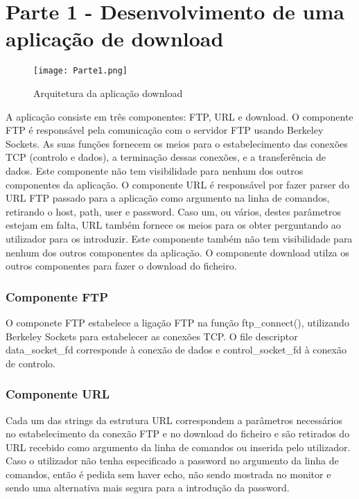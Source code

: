 \documentclass[a4paper]{article}
\begin{document}
\section{Parte 1 - Desenvolvimento de uma aplicação de download}

\begin{figure}[h]
    \centering
    \texttt{[image: Parte1.png]}
    \caption{Arquitetura da aplicação download}
\end{figure}


A aplicação consiste em três componentes: FTP, URL e download. O componente FTP
é responsável pela comunicação com o servidor FTP usando Berkeley Sockets. As
suas funções fornecem os meios para o estabelecimento das conexões TCP
(controlo e dados), a terminação dessas conexões, e a transferência de dados.
Este componente não tem visibilidade para nenhum dos outros componentes da
aplicação. O componente URL é responsável por fazer parser do URL FTP passado
para a aplicação como argumento na linha de comandos, retirando o host, path,
user e password. Caso um, ou vários, destes parâmetros estejam em falta, URL
também fornece os meios para os obter perguntando ao utilizador para os
introduzir. Este componente também não tem visibilidade para nenhum dos outros
componentes da aplicação. O componente download utilza os outros componentes
para fazer o download do ficheiro.

\subsubsection{Componente FTP}
O componete FTP estabelece a ligação FTP na função ftp\_connect(), utilizando
Berkeley Sockets para estabelecer as conexões TCP. O file descriptor
data\_socket\_fd corresponde à conexão de dados e control\_socket\_fd à conexão
de controlo.

\subsubsection{Componente URL}
Cada um das strings da estrutura URL correspondem a parâmetros necessários no
estabelecimento da conexão FTP e no download do ficheiro e são retirados do URL
recebido como argumento da linha de comandos ou inserida pelo utilizador. Caso
o utilizador não tenha especificado a password no argumento da linha de
comandos, então é pedida sem haver echo, não sendo mostrada no monitor e sendo
uma alternativa mais segura para a introdução da password.
\end{document}
